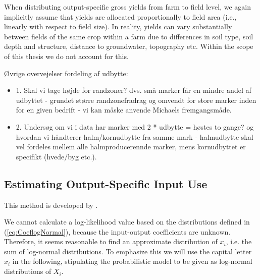 \documentclass[12pt]{article}
\begin{document}
When distributing output-specific gross yields from farm to field level, we again implicitly assume that yields are allocated proportionally to field area (i.e., linearly with respect to field size). In reality, yields can vary substantially between fields of the same crop within a farm due to differences in soil type, soil depth and structure, distance to groundwater, topography etc. Within the scope of this thesis we do not account for this. 




Øvrige overvejelser fordeling af udbytte: 


\begin{itemize}
     \item[] 1.	Skal vi tage højde for randzoner? dvs. små marker får en mindre andel af udbyttet - grundet større randzonefradrag og omvendt for store marker inden for en given bedrift - vi kan måske anvende Michaels fremgangsmåde.
    \end{itemize}
\begin{itemize}
     \item[] 2.	 Undersøg om vi i data har marker med 2 * udbytte = høstes to gange? og hvordan vi håndterer halm/kornudbytte fra samme mark - halmudbytte skal vel fordeles mellem alle halmproducerennde marker, mens kornudbyttet er specifikt (hvede/byg etc.).
    \end{itemize}

\newpage


\subsection{Estimating Output-Specific Input Use}
\label{sec:method-serie-b}
This method is developed by \cite{henningsen2026}.

We cannot calculate a log-likelihood value based on the distributions defined in (\ref{eq:CoeflogNormal}), because the input-output coefficients are unknown.
Therefore, it seems reasonable to find an approximate distribution of $x_i$, i.e. the sum of log-normal distributions.
To emphasize this we will use the capital letter $x_i$ in the following, stipulating the probabilistic model to be given as log-normal distributions of $X_i$.
\end{document}
